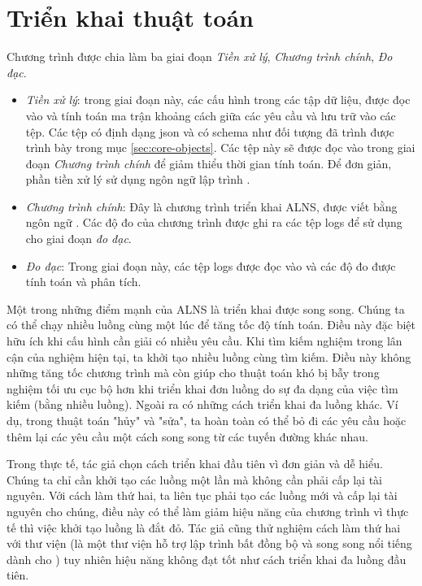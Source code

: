 \section{Triển khai thuật toán}
Chương trình được chia làm ba giai đoạn \textit{Tiền xử lý}, \textit{Chương trình chính}, \textit{Đo đạc}.
\begin{itemize}
	\item \textit{Tiền xử lý}: trong giai đoạn này, các cấu hình trong các tập dữ liệu, được đọc vào và tính toán ma trận khoảng cách giữa các yêu cầu và lưu trữ vào các tệp. Các tệp có định dạng json và có schema như đối tượng  đã trình được trình bày trong mục \ref{sec:core-objects}. Các tệp này sẽ được đọc vào trong giai đoạn \textit{Chương trình chính} để giảm thiểu thời gian tính toán. Để đơn giản, phần tiền xử lý sử dụng ngôn ngữ lập trình .
	\item \textit{Chương trình chính}: Đây là chương trình triển khai ALNS, được viết bằng ngôn ngữ . Các độ đo của chương trình được ghi ra các tệp logs để sử dụng cho giai đoạn \textit{đo đạc}.
	\item \textit{Đo đạc}: Trong giai đoạn này, các tệp logs được đọc vào và các độ đo được tính toán và phân tích.
\end{itemize}

Một trong những điểm mạnh của ALNS là triển khai được song song. Chúng ta có thể chạy nhiều luồng cùng một lúc để tăng tốc độ tính toán. Điều này đặc biệt hữu ích khi cấu hình cần giải có nhiều yêu cầu. Khi tìm kiếm nghiệm trong lân cận của nghiệm hiện tại, ta khởi tạo nhiều luồng cùng tìm kiếm. Điều này không những tăng tốc chương trình mà còn giúp cho thuật toán khó bị bẫy trong nghiệm tối ưu cục bộ hơn khi triển khai đơn luồng do sự đa dạng của việc tìm kiếm (bằng nhiều luồng). Ngoài ra có những cách triển khai đa luồng khác. Ví dụ, trong thuật toán "hủy" và "sửa", ta hoàn toàn có thể bỏ đi các yêu cầu hoặc thêm lại các yêu cầu một cách song song từ các tuyến đường khác nhau.

Trong thực tế, tác giả chọn cách triển khai đầu tiên vì đơn giản và dễ hiểu. Chúng ta chỉ cần khởi tạo các luồng một lần mà không cần phải cấp lại tài nguyên. Với cách làm thứ hai, ta liên tục phải tạo các luồng mới và cấp lại tài nguyên cho chúng, điều này có thể làm giảm hiệu năng của chương trình vì thực tế thì việc khởi tạo luồng là đắt đỏ. Tác giả cũng thử nghiệm cách làm thứ hai với thư viện  (là một thư viện hỗ trợ lập trình bất đồng bộ và song song nổi tiếng dành cho ) tuy nhiên hiệu năng không đạt tốt như cách triển khai đa luồng đầu tiên.